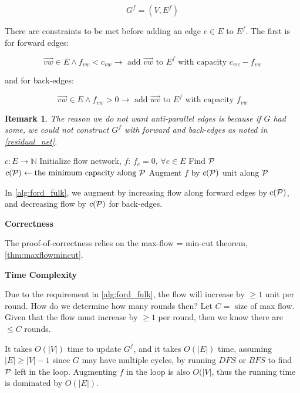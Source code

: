 \documentclass{article}
\newtheorem{remark}{Remark}
\theoremstyle{definition}
\begin{document}
$$G^f = (V, E^f)$$

There are constraints to be met before adding an edge $e \in E$ to $E^f$. The first is for forward edges:

$$\overrightarrow{vw} \in E \land f_{vw} < c_{vw} \to \text{ add } \overrightarrow{vw} \text { to } E^f \text { with capacity } c_{vw} - f_{vw}$$

and for back-edges:

$$\overrightarrow{vw} \in E \land f_{vw} > 0 \to \text{ add } \overrightarrow{wv} \text { to } E^f \text { with capacity } f_{vw}$$

\begin{remark}
The reason we do not want anti-parallel edges is because if $G$ had some, we could not construct $G^f$ with forward and back-edges as noted in \ref{residual_net}.
\end{remark}

\begin{algorithm}[H]
\caption{$FordFulkerson$}
\label{alg:ford_fulk}
\begin{algorithmic}[1]
	\REQUIRE $c : E \to \mathbb{N}$ 
	\STATE Initialize flow network, $f$: $f_e = 0, \, \forall e \in E$
		\STATE Find $\cal{P}$
		\STATE $c(\cal{P}) \gets \text{the minimum capacity along } \cal{P}$
		\STATE Augment $f$ by $c(\cal{P})$ unit along $\cal{P}$
	\ENDWHILE
\end{algorithmic}
\end{algorithm}

In \ref{alg:ford_fulk}, we augment by increasing flow along forward edges by $c(\cal{P})$, and decreasing flow by $c(\cal{P})$ for back-edges. 

\textbf{Correctness}

The proof-of-correctness relies on the max-flow = min-cut theorem, \ref{thm:maxflowmincut}. 

\textbf{Time Complexity}

Due to the requirement in \ref{alg:ford_fulk}, the flow will increase by $\geq 1$ unit per round. How do we determine how many rounds then? Let $C=$ size of max flow. Given that the flow must increase by $\geq 1$ per round, then we know there are $\leq C$ rounds. 

It takes $O(|V|)$ time to update $G^f$, and it takes $O(|E|)$ time, assuming $|E| \geq |V|-1$ since $G$ may have multiple cycles, by running $DFS$ or $BFS$ to find $\cal{P}$ left in the loop. Augmenting $f$ in the loop is also $O(|V|$, thus the running time is dominated by $O(|E|)$. 
\end{document}
